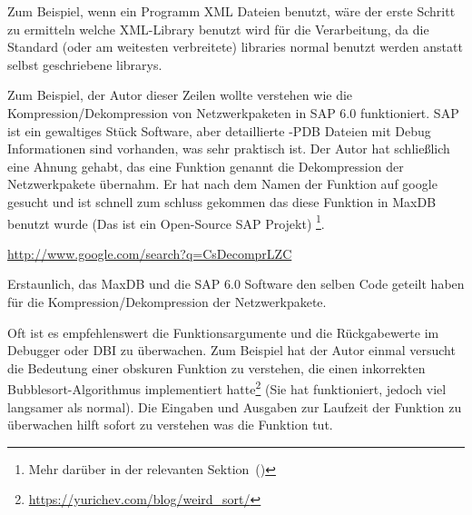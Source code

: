 Zum Beispiel, wenn ein Programm XML Dateien benutzt, w\"are der erste Schritt zu ermitteln welche
XML-Library benutzt wird f\"ur die Verarbeitung, da die Standard (oder am weitesten verbreitete) libraries
normal benutzt werden anstatt selbst geschriebene librarys.


Zum Beispiel, der Autor dieser Zeilen wollte verstehen wie die Kompression/Dekompression von Netzwerkpaketen in SAP 6.0 funktioniert.
SAP ist ein gewaltiges St\"uck Software, aber detaillierte -\gls{PDB} Dateien mit Debug Informationen sind vorhanden, was sehr praktisch 
ist. Der Autor hat schließlich eine Ahnung gehabt, das eine Funktion genannt  die Dekompression der Netzwerkpakete \"ubernahm.
Er hat nach dem Namen der Funktion auf google gesucht und ist schnell zum schluss gekommen das diese Funktion in 
MaxDB benutzt wurde (Das ist ein Open-Source SAP Projekt) \footnote{Mehr dar\"uber in der relevanten Sektion~()}. 

\url{http://www.google.com/search?q=CsDecomprLZC}

Erstaunlich, das MaxDB und die SAP 6.0 Software den selben Code geteilt haben f\"ur die Kompression/Dekompression der Netzwerkpakete.

 

Oft ist es empfehlenswert die Funktionsargumente und die R\"uckgabewerte im
Debugger oder \ac{DBI} zu \"uberwachen. Zum Beispiel hat der Autor einmal
versucht die Bedeutung einer obskuren Funktion zu verstehen, die einen inkorrekten
Bubblesort-Algorithmus implementiert hatte\footnote{\url{https://yurichev.com/blog/weird_sort/}}
(Sie hat funktioniert, jedoch viel langsamer als normal). Die Eingaben und Ausgaben zur Laufzeit 
der Funktion zu \"uberwachen hilft sofort zu verstehen was die Funktion tut.













